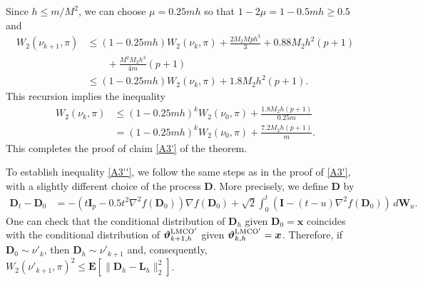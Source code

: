 \documentclass[aoap,preprint,reqno,a4paper]{imsart} %
\newcommand{\bvartheta}{\boldsymbol{\vartheta}}
\newcommand{\bfE}{\mathbf E}
\newcommand{\bfI}{\mathbf I}
\newcommand{\bW}{\boldsymbol W\!}
\newcommand{\bD}{\boldsymbol D}
\newcommand{\bL}{\boldsymbol L}
\newcommand{\bx}{\boldsymbol x}
\begin{document}
Since $h\le m/M^2$, we can choose $\mu = 0.25mh$ so that $1-2\mu = 1-0.5 mh \ge 0.5$ and
\begin{align}
W_2(\nu_{k+1},\pi)
		&\le (1 - 0.25mh)W_2(\nu_{k},\pi)+ \frac{2M_2Mph^3}{3}+ 0.88 M_2h^2(p+1)\\
		&\qquad +
		\frac{M^2M_2h^3}{4m}(p+1)\\
		&\le (1 - 0.25mh)W_2(\nu_{k},\pi)+ 1.8 M_2h^2(p+1).\label{eq13}
\end{align}
This recursion implies the inequality
\begin{align}
W_2(\nu_{k},\pi)
		&\le (1-0.25mh)^kW_2(\nu_{0},\pi)+ \frac{1.8M_2h(p+1)}{0.25m}\\
		&= (1-0.25mh)^kW_2(\nu_{0},\pi)+ \frac{7.2 M_2h(p+1)}{m}.
\end{align}
This completes the proof of claim \eqref{A3'} of the theorem.

To establish inequality \eqref{A3''}, we follow the same steps as in the proof of \eqref{A3'}, with a slightly different
choice of the process $\bD$. More precisely, we define $\bD$ by
\begin{align}
\bD_t -\bD_0 &= -(t\bfI_p-0.5t^2\nabla^2 f(\bD_0))\nabla f(\bD_0) + \sqrt{2}\int_0^t(\bfI-(t-u)\nabla^2 f(\bD_0))\,d\bW_u.
\end{align}
One can check that the conditional distribution of $\bD_h$ given $\bD_0=\bx$ coincides with the
conditional distribution of $\bvartheta_{k+1,h}^{\rm LMCO'}$ given $\bvartheta_{k,h}^{\rm LMCO'}=\bx$.
Therefore, if $\bD_0\sim \nu'_k$, then $\bD_h\sim \nu'_{k+1}$ and, consequently,
$W_2(\nu'_{k+1},\pi)^2 \le \bfE[\|\bD_h-\bL_h\|_2^2]$.
\end{document}
